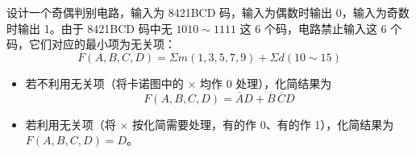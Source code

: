 \begin{example}
	设计一个奇偶判别电路，输入为 8421BCD 码，输入为偶数时输出 0，输入为奇数时输出 1。由于 8421BCD 码中无 $1010\sim1111$ 这 6 个码，电路禁止输入这 6 个码，它们对应的最小项为无关项：
	\begin{equation}
		F(A,B,C,D)=\Sigma m(1,3,5,7,9)+\Sigma d(10\sim15)
		\label{eq:化简:无关项例}
	\end{equation}
	\begin{itemize}
		\item 若不利用无关项（将卡诺图中的 $\times$ 均作 0 处理），化简结果为
		$$F(A,B,C,D)=\overline{A}D+\overline{B}\,\overline{C}D$$
		\item 若利用无关项（将 $\times$ 按化简需要处理，有的作 0、有的作 1），化简结果为
		$F(A,B,C,D)=D$。
	\end{itemize}
\end{example}
